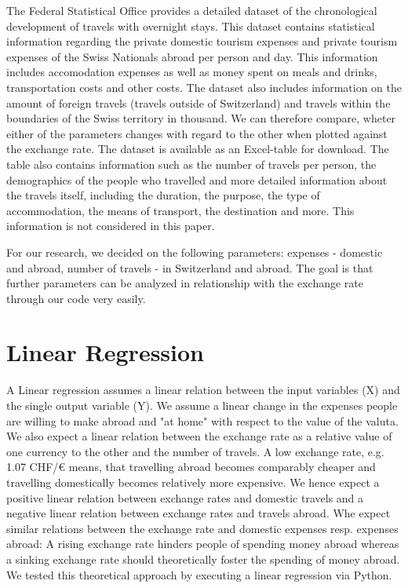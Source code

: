 \documentclass[12pt,a4paper,bibliography=totocnumbered,listof=totocnumbered]{scrartcl}
\begin{document}
The Federal Statistical Office provides a detailed dataset of the chronological development of travels with overnight stays. This dataset contains statistical information regarding the private domestic tourism expenses and private tourism expenses of the Swiss Nationals abroad per person and day. This information includes accomodation expenses as well as money spent on meals and drinks, transportation costs and other costs. The dataset also includes information on the amount of foreign travels (travels outside of Switzerland) and travels within the boundaries of the Swiss territory in thousand. We can therefore compare, wheter either of the parameters changes with regard to the other when plotted against the exchange rate. The dataset is available as an Excel-table for download. The table also contains information such as the number of travels per person, the demographics of the people who travelled and more detailed information about the travels itself, including the duration, the purpose, the type of accommodation, the means of transport, the destination and more. This information is not considered in this paper.

For our research, we decided on the following parameters: expenses - domestic and abroad, number of travels - in Switzerland and abroad. The goal is that further parameters can be analyzed in relationship with the exchange rate through our code very easily. 



\newpage
\section{Linear Regression}
A Linear regression assumes a linear relation between the input variables (X) and the single output variable (Y). We assume a linear change in the expenses people are willing to make abroad and "at home" with respect to the value of the valuta. We also expect a linear relation between the exchange rate as a relative value of one currency to the other and the number of travels. A low exchange rate, e.g. 1.07 CHF/€ means, that travelling abroad becomes comparably cheaper and travelling domestically becomes relatively more expensive. We hence expect a positive linear relation between exchange rates and domestic travels and a negative linear relation between exchange rates and travels abroad. Whe expect similar relations between the exchange rate and domestic expenses resp. expenses abroad: A rising exchange rate hinders people of spending money abroad whereas a sinking exchange rate should theoretically foster the spending of money abroad.\\ We tested this theoretical approach by executing a linear regression via Python. \\
\end{document}
